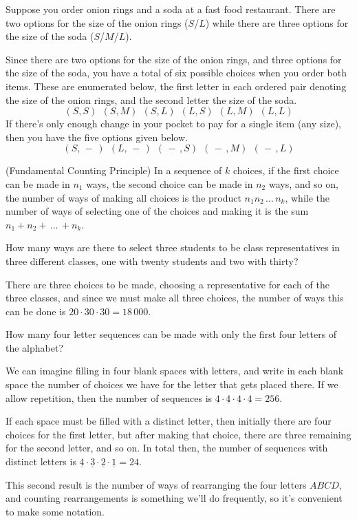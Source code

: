 Suppose you order onion rings and a soda at a fast food restaurant. There are two options for the size of the onion rings ($S$/$L$) while there are three options for the size of the soda ($S$/$M$/$L$).
\par
Since there are two options for the size of the onion rings, and three options for the size of the soda, you have a total of six possible choices when you order both items. These are enumerated below, the first letter in each ordered pair denoting the size of the onion rings, and the second letter the size of the soda.
$$(S,S)\ \ (S,M)\ \ (S,L)\ \ (L,S)\ \ (L,M)\ \ (L,L)$$
\indent If there's only enough change in your pocket to pay for a single item (any size), then you have the five options given below.
$$(S, \, - \, )\ \ (L, \, - \, )\ \ (\, - \, , S) \ \ (\, - \, , M) \ \ (\, - \, , L)$$
\par
\begin{prop}(Fundamental Counting Principle) \label{FundamentalCountingPrinciple} In a sequence of $k$ choices, if the first choice can be made in $n_1$ ways, the second choice can be made in $n_2$ ways, and so on, the number of ways of making all choices is the product $n_1 n_2 \,...\, n_k$, while the number of ways of selecting one of the choices and making it is the sum $n_1 + n_2 + \,...\, + n_k$.
\end{prop}
\begin{examp}
How many ways are there to select three students to be class representatives in three different classes, one with twenty students and two with thirty?
\par
\noindent There are three choices to be made, choosing a representative for each of the three classes, and since we must make all three choices, the number of ways this can be done is $20 \cdot 30 \cdot 30 = 18\,000$.\end{examp}
\begin{examp}
How many four letter sequences can be made with only the first four letters of the alphabet?
\par
\noindent We can imagine filling in four blank spaces with letters, and write in each blank space the number of choices we have for the letter that gets placed there. If we allow repetition, then the number of sequences is $\underline{4} \cdot \underline{4} \cdot \underline{4} \cdot \underline{4} = 256$.
\par
\noindent If each space must be filled with a distinct letter, then initially there are four choices for the first letter, but after making that choice, there are three remaining for the second letter, and so on. In total then, the number of sequences with distinct letters is $\underline{4} \cdot \underline{3} \cdot \underline{2} \cdot \underline{1} = 24$. 
\par
\noindent This second result is the number of ways of rearranging the four letters $ABCD$, and counting rearrangements is something we'll do frequently, so it's convenient to make some notation.
\end{examp}
